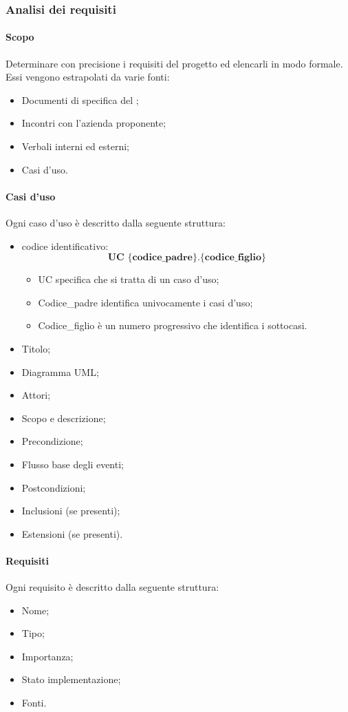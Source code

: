 \subsubsection{Analisi dei requisiti}
\paragraph{Scopo}\Spazio
Determinare con precisione i requisiti del progetto ed elencarli in modo formale. Essi vengono estrapolati da varie fonti:
\begin{itemize}
	\item Documenti di specifica del ;
	\item Incontri con l'azienda proponente;
	\item Verbali interni ed esterni;
	\item Casi d'uso.
\end{itemize}
\paragraph{Casi d'uso}\Spazio
Ogni caso d'uso è descritto dalla seguente struttura:
\begin{itemize}
	\item codice identificativo: $$ \textbf{UC \{codice\_padre\}.\{codice\_figlio\}  } $$
		\begin{itemize}
				\item UC specifica che si tratta di un caso d'uso;
				\item Codice\_padre identifica univocamente i casi d'uso;
				\item Codice\_figlio è un numero progressivo che identifica i sottocasi.
		\end{itemize}
	\item Titolo;
	\item Diagramma UML;
	\item Attori;
	\item Scopo e descrizione;
	\item Precondizione;
	\item Flusso base degli eventi;
	\item Postcondizioni;
	\item Inclusioni (se presenti);
	\item Estensioni (se presenti).
\end{itemize}
\paragraph{Requisiti}\Spazio
Ogni requisito è descritto dalla seguente struttura:
\begin{itemize}
	\item Nome;
	\item Tipo;
	\item Importanza;
	\item Stato implementazione;
	\item Fonti.
\end{itemize}

